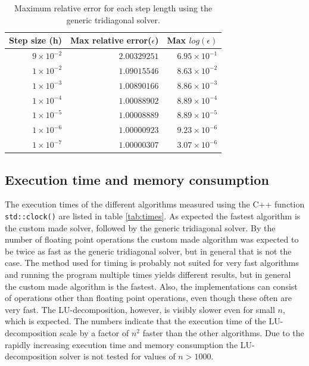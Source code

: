 \documentclass{article}
\begin{document}
\begin{table}[h]
\centering
\begin{tabular}{r|r|r}
Step size (h) & Max relative error($\epsilon$) & Max $log(\epsilon)$\\
\hline
$9 \times 10^{-2}$ & $2.00329251$ & $6.95 \times 10^{-1}$\\
$1 \times 10^{-2}$ & $1.09015546$ & $8.63 \times 10^{-2}$\\
$1 \times 10^{-3}$ & $1.00890166$ & $8.86 \times 10^{-3}$\\
$1 \times 10^{-4}$ & $1.00088902$ & $8.89 \times 10^{-4}$\\
$1 \times 10^{-5}$ & $1.00008889$ & $8.89 \times 10^{-5}$\\
$1 \times 10^{-6}$ & $1.00000923$ & $9.23 \times 10^{-6}$\\
$1 \times 10^{-7}$ & $1.00000307$ & $3.07 \times 10^{-6}$\\
\hline
\end{tabular}
\caption{Maximum relative error for each step length using the generic tridiagonal solver.}
\label{tab:error}
\end{table}



\subsection{Execution time and memory consumption}

The execution times of the different algorithms measured using the C++ function \texttt{std::clock()} are listed in table \ref{tab:times}. As expected the fastest algorithm is the custom made solver, followed by the generic tridiagonal solver. By the number of floating point operations the custom made algorithm was expected to be twice as fast as the generic tridiagonal solver, but in general that is not the case. The method used for timing is probably not suited for very fast algorithms and running the program multiple times yields different results, but in general the custom made algorithm is the fastest. Also, the implementations can consist of operations other than floating point operations, even though these often are very fast. The LU-decomposition, however, is visibly slower even for small $n$, which is expected.  The numbers indicate that the execution time of the LU-decomposition scale by a factor of $n^2$ faster than the other algorithms. Due to the rapidly increasing execution time and memory consumption the LU-decomposition solver is not tested for values of $n>1000$.
\end{document}
